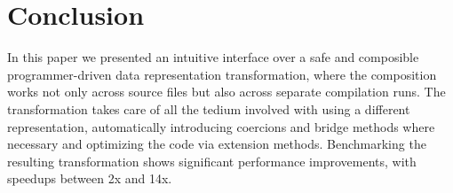 \section{Conclusion}
\label{sec:concls}

In this paper we presented an intuitive interface over a safe and composible programmer-driven data representation transformation, where the composition works not only across source
files but also across separate compilation runs. The transformation takes care of all the tedium involved with using a different representation, automatically introducing coercions and bridge methods where necessary and optimizing the code via extension methods. Benchmarking the resulting transformation shows significant performance improvements, with speedups between 2x and 14x.